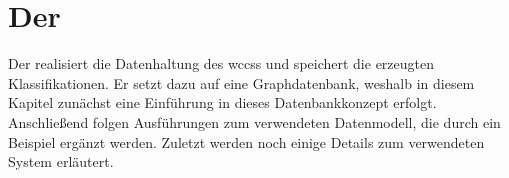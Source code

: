 \section{Der {\classificationStorage}}
    \label{section:solutionDetailsPersistence}
    Der {\classificationStorage} realisiert die Datenhaltung des \glspl{wccs}
    und speichert die erzeugten Klassifikationen.
    Er setzt dazu auf eine Graphdatenbank,
    weshalb in diesem Kapitel zunächst eine Einführung
    in dieses Datenbankkonzept erfolgt.
    Anschließend folgen Ausführungen zum verwendeten Datenmodell,
    die durch ein Beispiel ergänzt werden.
    Zuletzt werden noch einige Details zum verwendeten System erläutert.

    
    
    
    
